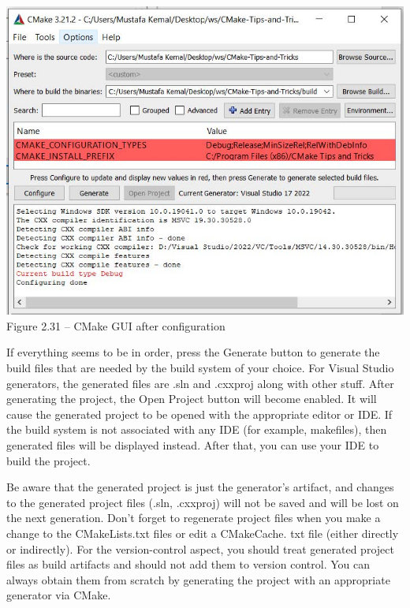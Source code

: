 \begin{center}
\includegraphics[width=1.\textwidth]{content/1/chapter2/images/31.jpg}\\
Figure 2.31 – CMake GUI after configuration
\end{center}

If everything seems to be in order, press the Generate button to generate the build files that are needed by the build system of your choice. For Visual Studio generators, the generated files are .sln and .cxxproj along with other stuff. After generating the project, the Open Project button will become enabled. It will cause the generated project to be opened with the appropriate editor or IDE. If the build system is not associated with any IDE (for example, makefiles), then generated files will be displayed instead. After that, you can use your IDE to build the project.

\begin{tcolorbox}[colback=webgreen!5!white,colframe=webgreen!75!black,title=Important Note]
Be aware that the generated project is just the generator's artifact, and changes to the generated project files (.sln, .cxxproj) will not be saved and will be lost on the next generation. Don't forget to regenerate project files when you  make a change to the CMakeLists.txt files or edit a CMakeCache. txt file (either directly or indirectly). For the version-control aspect, you should treat generated project files as build artifacts and should not add them to version control. You can always obtain them from scratch by generating the project with an appropriate generator via CMake.
\end{tcolorbox}

